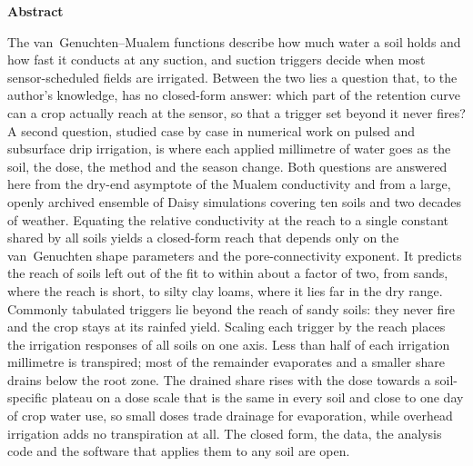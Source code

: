 
\newcommand{\hc}{h_{\mathrm{c}}}
\newcommand{\htr}{h_{\mathrm{t}}}

\linenumbers
\begin{titlepage}
\vspace*{-1.2cm}
\begin{center}\begin{minipage}{0.94\textwidth}\end{minipage}\end{center}
\vspace{0.4cm}
\authorblock
\vspace{0.3cm}
{\small\setlength{\parindent}{0pt}\setlength{\parskip}{0pt}
\begin{center}\textbf{\normalsize Abstract}\end{center}\vspace{-0.4em}
\noindent The van~Genuchten--Mualem functions describe how much water a soil holds and how fast it conducts at any suction, and suction triggers decide when most sensor-scheduled fields are irrigated. Between the two lies a question that, to the author's knowledge, has no closed-form answer: which part of the retention curve can a crop actually reach at the sensor, so that a trigger set beyond it never fires? A second question, studied case by case in numerical work on pulsed and subsurface drip irrigation, is where each applied millimetre of water goes as the soil, the dose, the method and the season change. Both questions are answered here from the dry-end asymptote of the Mualem conductivity and from a large, openly archived ensemble of Daisy simulations covering ten soils and two decades of weather. Equating the relative conductivity at the reach to a single constant shared by all soils yields a closed-form reach that depends only on the van~Genuchten shape parameters and the pore-connectivity exponent. It predicts the reach of soils left out of the fit to within about a factor of two, from sands, where the reach is short, to silty clay loams, where it lies far in the dry range. Commonly tabulated triggers lie beyond the reach of sandy soils: they never fire and the crop stays at its rainfed yield. Scaling each trigger by the reach places the irrigation responses of all soils on one axis. Less than half of each irrigation millimetre is transpired; most of the remainder evaporates and a smaller share drains below the root zone. The drained share rises with the dose towards a soil-specific plateau on a dose scale that is the same in every soil and close to one day of crop water use, so small doses trade drainage for evaporation, while overhead irrigation adds no transpiration at all. The closed form, the data, the analysis code and the software that applies them to any soil are open.

}
\end{titlepage}
